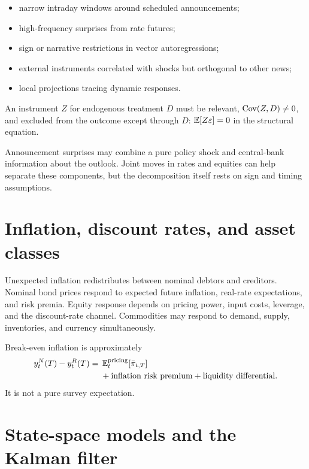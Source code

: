 \begin{itemize}
\item narrow intraday windows around scheduled announcements;
\item high-frequency surprises from rate futures;
\item sign or narrative restrictions in vector autoregressions;
\item external instruments correlated with shocks but orthogonal to other news;
\item local projections tracing dynamic responses.
\end{itemize}

\begin{definition}
An instrument $Z$ for endogenous treatment $D$ must be relevant,
$\operatorname{Cov}(Z,D)\neq0$, and excluded from the outcome except through $D$:
$\operatorname{\mathbb E}[Z\varepsilon]=0$ in the structural equation.
\end{definition}

Announcement surprises may combine a pure policy shock and central-bank information
about the outlook. Joint moves in rates and equities can help separate these
components, but the decomposition itself rests on sign and timing assumptions.

\section{Inflation, discount rates, and asset classes}

Unexpected inflation redistributes between nominal debtors and creditors. Nominal
bond prices respond to expected future inflation, real-rate expectations, and risk
premia. Equity response depends on pricing power, input costs, leverage, and the
discount-rate channel. Commodities may respond to demand, supply, inventories, and
currency simultaneously.

Break-even inflation is approximately
\[
\begin{aligned}
y_t^{N}(T)-y_t^{R}(T)
={}&\operatorname{\mathbb E}_t^{\mathrm{pricing}}[\bar\pi_{t,T}]\\
&+\text{inflation risk premium}
+\text{liquidity differential}.
\end{aligned}
\]
It is not a pure survey expectation.

\section{State-space models and the Kalman filter}

